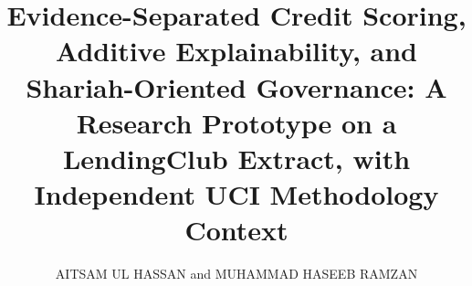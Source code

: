 \documentclass{ieeeaccess}
\begin{document}
\title{Evidence-Separated Credit Scoring, Additive Explainability, and Shariah-Oriented Governance: A Research Prototype on a LendingClub Extract, with Independent UCI Methodology Context}
\author{\uppercase{Aitsam Ul Hassan} and \uppercase{Muhammad Haseeb Ramzan}}
\address[1]{Pak-Austria Fachhochschule: Institute of Applied Sciences and Technology, Haripur, Pakistan (e-mails: aitsamulhassan.awan@gmail.com; haseebramzan536@gmail.com)}

\markboth{}{}
\makeatletter
\long\def\@maketitle{%
  \setbox\maketitlebox\hbox\bgroup
  \begin{minipage}{\titlewidth}%
  \raggedright\vspace*{1.2mm}%
  {\vss\color{accessblue}\titlefont\@title\vss}\vspace*{6mm}\par
  \ifaccesseditors\vspace*{2mm}\else{\vss\authorfont\@author\vss}\vspace*{0mm}\par
  \@tempcnta=0%
  \loop\ifnum\@tempcnta<\theaddrCtr
    \advance\@tempcnta by 1%
    \par{\vss\addressfont\textsuperscript{\expandafter\csname addrInd\the\@tempcnta\endcsname}%
     \expandafter\csname addr\the\@tempcnta\endcsname\vss}%
  \repeat\vspace*{1mm}\par
  {\vss\correspfont\@corresp\vss\vspace{2mm}}\par\fi
  {\vss\tfootnotefont\@tfootnote\vss\vspace{7mm}}\par
  \noindent\box99\vspace{6mm}\par
  \ifaccesseditors\vspace*{8mm}\else
  \noindent\box88\vspace{18mm}\par
  \fi
  \end{minipage}\par
  \egroup
  \box\maketitlebox
  \vspace*{3.5pt}%
  \vspace*{\titlepgskip}%
}
\def\ps@headings{%
  \def\@oddhead{\hfill}%
  \def\@evenhead{\hfill}%
  \def\@oddfoot{%
    \hbox to \textwidth{\hfill{\footerpagefont\thepage}\hfill}}%
  \def\@evenfoot{%
    \hbox to \textwidth{\hfill{\footerpagefont\thepage}\hfill}}%
}
\def\ps@titlepage{%
  \def\@oddhead{\hfill}%
  \def\@evenhead{\hfill}%
  \def\@oddfoot{%
    \hbox to \textwidth{\hfill{\footerpagefont\thepage}\hfill}}%
  \def\@evenfoot{%
    \hbox to \textwidth{\hfill{\footerpagefont\thepage}\hfill}}%
}
\ps@headings
\makeatother
\end{document}
